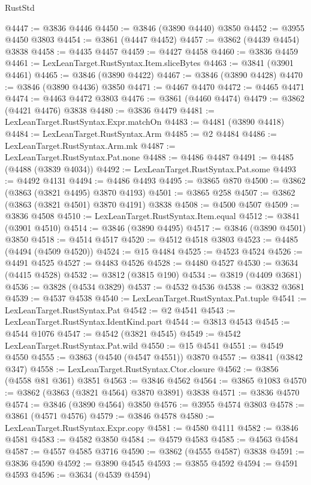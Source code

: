 \begin{lexlean}{RustStd}
\begin{coremodule}
@4447 := @3836 @4446
@4450 := @3846 (@3890 @4440) @3850
@4452 := @3955 @4450 @3803
@4454 := @3861 (@4447 @4452)
@4457 := @3862 (@4439 @4454) @3838
@4458 := @4435 @4457
@4459 := @4427 @4458
@4460 := @3836 @4459
@4461 := LexLeanTarget.RustSyntax.Item.sliceBytes
@4463 := @3841 (@3901 @4461)
@4465 := @3846 (@3890 @4422)
@4467 := @3846 (@3890 @4428)
@4470 := @3846 (@3890 @4436) @3850
@4471 := @4467 @4470
@4472 := @4465 @4471
@4474 := @4463 @4472 @3803
@4476 := @3861 (@4460 @4474)
@4479 := @3862 (@4421 @4476) @3838
@4480 := @3836 @4479
@4481 := LexLeanTarget.RustSyntax.Expr.matchOn
@4483 := @4481 (@3890 @4418)
@4484 := LexLeanTarget.RustSyntax.Arm
@4485 := @2 @4484
@4486 := LexLeanTarget.RustSyntax.Arm.mk
@4487 := LexLeanTarget.RustSyntax.Pat.none
@4488 := @4486 @4487
@4491 := @4485 (@4488 (@3839 @4034))
@4492 := LexLeanTarget.RustSyntax.Pat.some
@4493 := @4492 @4131
@4494 := @4486 @4493
@4495 := @3865 @870
@4500 := @3862 (@3863 (@3821 @4495) @3870 @4193)
@4501 := @3865 @258
@4507 := @3862 (@3863 (@3821 @4501) @3870 @4191) @3838
@4508 := @4500 @4507
@4509 := @3836 @4508
@4510 := LexLeanTarget.RustSyntax.Item.equal
@4512 := @3841 (@3901 @4510)
@4514 := @3846 (@3890 @4495)
@4517 := @3846 (@3890 @4501) @3850
@4518 := @4514 @4517
@4520 := @4512 @4518 @3803
@4523 := @4485 (@4494 (@4509 @4520))
@4524 := @15 @4484
@4525 := @4523 @4524
@4526 := @4491 @4525
@4527 := @4483 @4526
@4528 := @4480 @4527
@4530 := @3634 (@4415 @4528)
@4532 := @3812 (@3815 @190)
@4534 := @3819 (@4409 @3681)
@4536 := @3828 (@4534 @3829)
@4537 := @4532 @4536
@4538 := @3832 @3681
@4539 := @4537 @4538
@4540 := LexLeanTarget.RustSyntax.Pat.tuple
@4541 := LexLeanTarget.RustSyntax.Pat
@4542 := @2 @4541
@4543 := LexLeanTarget.RustSyntax.IdentKind.part
@4544 := @3813 @4543
@4545 := @4544 @1076
@4547 := @4542 (@3821 @4545)
@4549 := @4542 LexLeanTarget.RustSyntax.Pat.wild
@4550 := @15 @4541
@4551 := @4549 @4550
@4555 := @3863 (@4540 (@4547 @4551)) @3870
@4557 := @3841 (@3842 @347)
@4558 := LexLeanTarget.RustSyntax.Ctor.closure
@4562 := @3856 (@4558 @81 @361) @3851
@4563 := @3846 @4562
@4564 := @3865 @1083
@4570 := @3862 (@3863 (@3821 @4564) @3870 @3891) @3838
@4571 := @3836 @4570
@4574 := @3846 (@3890 @4564) @3850
@4576 := @3955 @4574 @3803
@4578 := @3861 (@4571 @4576)
@4579 := @3846 @4578
@4580 := LexLeanTarget.RustSyntax.Expr.copy
@4581 := @4580 @4111
@4582 := @3846 @4581
@4583 := @4582 @3850
@4584 := @4579 @4583
@4585 := @4563 @4584
@4587 := @4557 @4585 @3716
@4590 := @3862 (@4555 @4587) @3838
@4591 := @3836 @4590
@4592 := @3890 @4545
@4593 := @3855 @4592
@4594 := @4591 @4593
@4596 := @3634 (@4539 @4594)

\end{coremodule}
\end{lexlean}
